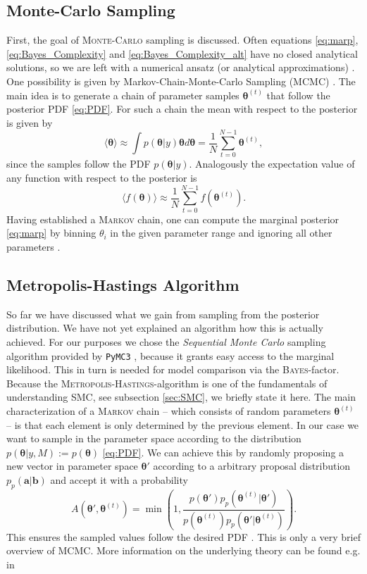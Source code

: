 \documentclass[%
 reprint,
 amsmath,amssymb,
 aps,
]{revtex4-1}
\newcommand{\btheta}{\boldsymbol{\theta}}
\begin{document}
 \subsection{Monte-Carlo Sampling}
\noindent First, the goal of \textsc{Monte-Carlo} sampling is discussed. Often equations \eqref{eq:marp}, \eqref{eq:Bayes_Complexity} and \eqref{eq:Bayes_Complexity_alt} have no closed analytical solutions, so we are left with a numerical ansatz (or analytical approximations) \cite{Toussaint}. One possibility is given by Markov-Chain-Monte-Carlo Sampling (MCMC) \cite{Toussaint}. The main idea is to generate a chain of parameter samples $\boldsymbol{\theta}^{(t)}$ that follow the posterior PDF \eqref{eq:PDF}. For such a chain the mean with respect to the posterior is given by 
 \begin{equation}
 	\langle \boldsymbol{\theta}\rangle\approx \int p(\boldsymbol{\theta} | y)\boldsymbol{\theta}d\boldsymbol{\theta}=\frac{1}{N}\sum_{t=0}^{N-1}\boldsymbol{\theta}^{(t)},
 \end{equation}
since the samples follow the PDF $p(\boldsymbol{\theta} | y)$. Analogously the expectation value of any function with respect to the posterior is
 \begin{equation}
	\langle f(\boldsymbol{\theta})\rangle\approx\frac{1}{N}\sum_{t=0}^{N-1}f(\boldsymbol{\theta}^{(t)}).
\end{equation}
Having established a \textsc{Markov} chain, one can compute the marginal posterior \eqref{eq:marp} by binning $\theta_i$ in the given parameter range and ignoring all other parameters \cite{Trotta_2008}. 

\subsection{Metropolis-Hastings Algorithm}
\noindent So far we have discussed what we gain from sampling from the posterior distribution. We have not yet explained an algorithm how this is actually achieved.  For our purposes we chose the \emph{Sequential Monte Carlo} sampling algorithm provided by \texttt{PyMC3} \cite{PyMC3_SMC}, because it grants easy access to the marginal likelihood. This in turn is needed for model comparison via the \textsc{Bayes}-factor. Because the \textsc{Metropolis-Hastings}-algorithm is one of the fundamentals of understanding SMC, see subsection \eqref{sec:SMC}, we briefly state it here. The main characterization of a \textsc{Markov} chain -- which consists of random parameters $\boldsymbol{\theta}^{(t)}$ -- is that each element is only determined by the previous element. In our case we want to sample in the parameter space according to the distribution $p(\btheta|y,M):=p(\btheta)$ \eqref{eq:PDF}. We can achieve this by randomly proposing a new vector in parameter space $\btheta'$  according to a arbitrary proposal distribution $p_p(\boldsymbol{a}|\boldsymbol{b})$ and accept it with a probability $$A(\btheta',\btheta^{(t)})=\min\left(1,\frac{p(\btheta')p_p(\btheta^{(t)}|\btheta')}{p(\btheta^{(t)})p_p(\btheta'|\btheta^{(t)})}\right).$$
This ensures the sampled values follow the desired PDF \cite{Toussaint}. This is only a very brief overview of MCMC. More information on the underlying theory can be found e.g. in \cite{neal}
\end{document}
